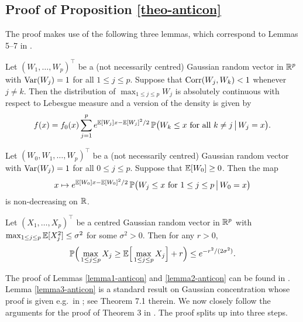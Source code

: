 \documentclass[a4paper,12pt]{article}
\begin{document}
\subsection*{Proof of Proposition \ref{theo-anticon}}

 
The proof makes use of the following three lemmas, which correspond to Lemmas 5--7 in \cite{Chernozhukov2015}. 
\begin{lemmaS}\label{lemma1-anticon}
Let $(W_1,\ldots,W_p)^\top$ be a (not necessarily centred) Gaussian random vector in $\mathbb{R}^p$ with $\textnormal{Var}(W_j) = 1$ for all $1 \le j \le p$. Suppose that $\textnormal{Corr}(W_j,W_k) < 1$ whenever $j \ne k$. Then the distribution of $\max_{1 \le j \le p} W_j$ is absolutely continuous with respect to Lebesgue measure and a version of the density is given by 
\[ f(x) = f_0(x) \sum\limits_{j=1}^p e^{\mathbb{E}[W_j]x - \mathbb{E}[W_j]^2/2} \, \mathbb{P} \big(W_k \le x \text{ for all } k \ne j \, \big| \, W_j = x \big). \]
\end{lemmaS}
\begin{lemmaS}\label{lemma2-anticon}
Let $(W_0,W_1,\ldots,W_p)^\top$ be a (not necessarily centred) Gaussian random vector with $\textnormal{Var}(W_j) = 1$ for all $0 \le j \le p$. Suppose that $\mathbb{E}[W_0] \ge 0$. Then the map 
\[ x \mapsto  e^{\mathbb{E}[W_0]x - \mathbb{E}[W_0]^2/2} \, \mathbb{P} \big(W_j \le x \text{ for } 1 \le j \le p \, \big| \, W_0 = x \big) \]
is non-decreasing on $\mathbb{R}$. 
\end{lemmaS}
\begin{lemmaS}\label{lemma3-anticon}
Let $(X_1,\ldots,X_p)^\top$ be a centred Gaussian random vector in $\mathbb{R}^p$ with $\max_{1 \le j \le p} \mathbb{E}[X_j^2] \le \sigma^2$ for some $\sigma^2 > 0$. Then for any $r > 0$, 
\[ \mathbb{P} \Big( \max_{1 \le j \le p} X_j \ge \mathbb{E} \Big[ \max_{1 \le j \le p} X_j \Big] + r \Big) \le e^{-r^2/(2\sigma^2)}. \]
\end{lemmaS} 
The proof of Lemmas \ref{lemma1-anticon} and \ref{lemma2-anticon} can be found in \cite{Chernozhukov2015}. Lemma \ref{lemma3-anticon} is a standard result on Gaussian concentration whose proof is given e.g.\ in \cite{Ledoux2001}; see Theorem 7.1 therein. We now closely follow the arguments for the proof of Theorem 3 in \cite{Chernozhukov2015}. The proof splits up into three steps. 
\vspace{7pt}
\end{document}
